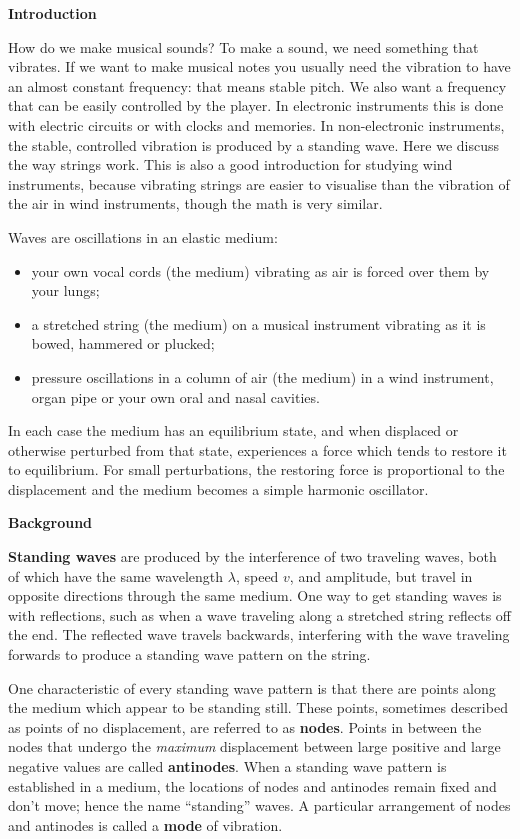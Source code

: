 \textbf{Introduction}

How do we make musical sounds? To make a sound, we need something that vibrates. If we want to make musical notes you usually need the vibration to
have an almost constant frequency: that means stable pitch. We also want a frequency that can be easily controlled by the player. In electronic
instruments this is done with electric circuits or with clocks and memories. In non-electronic instruments, the stable, controlled vibration is
produced by a standing wave. Here we discuss the way strings work. This is also a good introduction for studying wind instruments, because vibrating
strings are easier to visualise than the vibration of the air in wind instruments, though the math is very similar.

Waves are oscillations in an elastic medium:
\begin{itemize}
\item  your own vocal cords (the medium) vibrating as air is forced over them by your lungs; 
\item  a stretched string (the medium) on a musical instrument vibrating as it is bowed, hammered or plucked; 
\item  pressure oscillations in a column of air (the medium) in a wind instrument, organ pipe or your own oral and nasal cavities.
\end{itemize}

In each case the medium has an equilibrium state, and when displaced or otherwise perturbed from that state, experiences a force which tends to
restore it to equilibrium. For small perturbations, the restoring force is proportional to the displacement and the medium becomes a simple harmonic
oscillator.


\textbf{Background}

\textbf{Standing waves} are produced by the interference of two traveling waves, both of which have the
same wavelength $\lambda$, speed $v$, and amplitude, but travel in opposite directions through the same medium. 
One way to get standing waves is with reflections, such as when a wave traveling along a stretched string reflects off the end.  The reflected wave travels backwards, interfering with the wave traveling forwards to produce a standing wave pattern on the string.  

One characteristic of every standing wave pattern is that there are points along the medium which appear to be standing still. These points,
sometimes described as points of no displacement, are referred to as \textbf{nodes}. Points in between the nodes that undergo the \textit{maximum} displacement between
large positive and large negative values are called \textbf{antinodes}. When a standing wave pattern is established in a medium, the locations of nodes and antinodes remain fixed and don't move; hence the name ``standing'' waves.  A particular arrangement of nodes and antinodes is called a \textbf{mode} of vibration.

